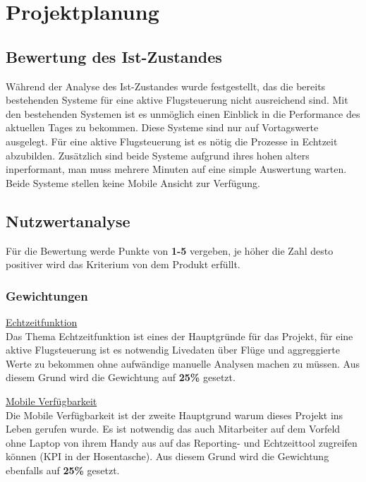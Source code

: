 \section{Projektplanung}

	\subsection{Bewertung des Ist-Zustandes}
	Während der Analyse des Ist-Zustandes wurde festgestellt, das die bereits bestehenden Systeme für eine aktive Flugsteuerung nicht ausreichend sind. Mit den bestehenden Systemen ist es unmöglich einen Einblick in die Performance des aktuellen Tages zu bekommen. Diese Systeme sind nur auf Vortagswerte ausgelegt. Für eine aktive Flugsteuerung ist es nötig die Prozesse in Echtzeit abzubilden. Zusätzlich sind beide Systeme aufgrund ihres hohen alters inperformant, man muss mehrere Minuten auf eine simple Auswertung warten. Beide Systeme stellen keine Mobile Ansicht zur Verfügung.


	
	\subsection{Nutzwertanalyse}
	Für die Bewertung werde Punkte von \textbf{1-5} vergeben, je höher die Zahl desto positiver wird das Kriterium von dem Produkt erfüllt.

		\subsubsection{Gewichtungen}

		{
			\underline{Echtzeitfunktion}\\
			Das Thema Echtzeitfunktion ist eines der Hauptgründe für das Projekt, für eine aktive Flugsteuerung ist es notwendig Livedaten über Flüge und aggreggierte Werte zu bekommen ohne aufwändige manuelle Analysen machen zu müssen. Aus diesem Grund wird die Gewichtung auf \textbf{25\%} gesetzt.
		
		}

		\vspace{8pt}

		{
			\noindent
			\underline{Mobile Verfügbarkeit}\\
			Die Mobile Verfügbarkeit ist der zweite Hauptgrund warum dieses Projekt ins Leben gerufen wurde. Es ist notwendig das auch Mitarbeiter auf dem Vorfeld ohne Laptop von ihrem Handy aus auf das Reporting- und Echtzeittool zugreifen können (KPI in der Hosentasche). Aus diesem Grund wird die Gewichtung ebenfalls auf \textbf{25\%} gesetzt.
		}

